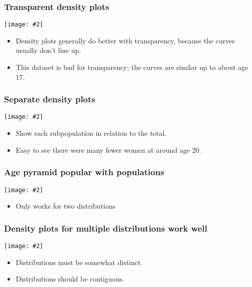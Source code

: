 \documentclass{beamer}
\newcommand{\bi}{\begin{itemize}}
\newcommand{\li}{\item}
\newcommand{\ei}{\end{itemize}}
\newcommand{\fig}[2]{\centerline{\texttt{[image: \#2]}}}
\newcommand{\bfr}[1]{\begin{frame}[fragile]\frametitle{{ #1 }}}
\begin{document}
\bfr{Transparent density plots}
\fig{0.8}{titanic-age-overlapping-dens-1.png}
\bi
\li Density plots generally do better with transparency,
because the curves usually don't line up.
\li This dataset is bad for transparency; the curves
are similar up to about age 17.
\ei
\end{frame}

\bfr{Separate density plots}
\fig{1}{titanic-age-fractional-dens-1.png}
\bi
\li Show each subpopulation in relation to the total.
\li Easy to see there were many fewer women at around age 20.
\ei
\end{frame}

\bfr{Age pyramid popular with populations}
\fig{.8}{titanic-age-pyramid-1.png}

\bi
\li Only works for two distributions
\ei

\end{frame}

\bfr{Density plots for multiple distributions work well}
\fig{1}{butterfat-densitites-1.png}

\bi
\li Distributions must be somewhat distinct.
\li Distributions should be contiguous.
\ei

\end{frame}
\end{document}
